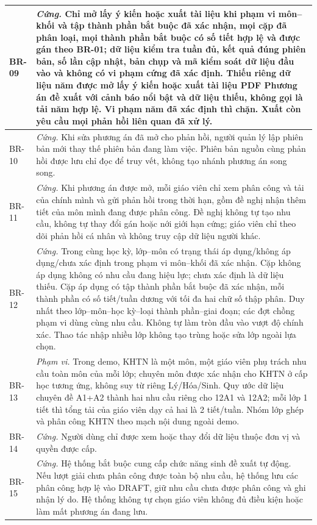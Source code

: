 \documentclass[12pt,a4paper]{report}
\begin{document}
\begin{longtable}{|p{1.45cm}|p{12.5cm}|}
BR-09 & \textit{Cứng.} Chỉ mở lấy ý kiến hoặc xuất tài liệu khi phạm vi môn--khối và tập thành phần bắt buộc đã xác nhận, mọi cặp đã phân loại, mọi thành phần bắt buộc có số tiết hợp lệ và được gán theo BR-01; dữ liệu kiểm tra tuần đủ, kết quả đúng phiên bản, số lần cập nhật, bản chụp và mã kiểm soát dữ liệu đầu vào và không có vi phạm cứng đã xác định. Thiếu riêng dữ liệu năm được mở lấy ý kiến hoặc xuất tài liệu PDF Phương án đề xuất với cảnh báo nổi bật và dữ liệu thiếu, không gọi là tải năm hợp lệ. Vi phạm năm đã xác định thì chặn. Xuất còn yêu cầu mọi phản hồi liên quan đã xử lý. \\\hline
BR-10 & \textit{Cứng.} Khi sửa phương án đã mở cho phản hồi, người quản lý lập phiên bản mới thay thế phiên bản đang làm việc. Phiên bản nguồn cùng phản hồi được lưu chỉ đọc để truy vết, không tạo nhánh phương án song song. \\\hline
BR-11 & \textit{Cứng.} Khi phương án được mở, mỗi giáo viên chỉ xem phân công và tải của chính mình và gửi phản hồi trong thời hạn, gồm đề nghị nhận thêm tiết của môn mình đang được phân công. Đề nghị không tự tạo nhu cầu, không tự thay đổi gán hoặc nới giới hạn cứng; giáo viên chỉ theo dõi phản hồi cá nhân và không truy cập dữ liệu người khác. \\\hline
BR-12 & \textit{Cứng.} Trong cùng học kỳ, lớp--môn có trạng thái áp dụng/không áp dụng/chưa xác định trong phạm vi môn--khối đã xác nhận. Cặp không áp dụng không có nhu cầu đang hiệu lực; chưa xác định là dữ liệu thiếu. Cặp áp dụng có tập thành phần bắt buộc đã xác nhận, mỗi thành phần có số tiết/tuần dương với tối đa hai chữ số thập phân. Duy nhất theo lớp--môn--học kỳ--loại thành phần--giai đoạn; các đợt chồng phạm vi dùng cùng nhu cầu. Không tự làm tròn đầu vào vượt độ chính xác. Thao tác nhập nhiều lớp không tạo trùng hoặc sửa lớp ngoài lựa chọn. \\\hline
BR-13 & \textit{Phạm vi.} Trong demo, KHTN là một môn, một giáo viên phụ trách nhu cầu toàn môn của mỗi lớp; chuyên môn được xác nhận cho KHTN ở cấp học tương ứng, không suy từ riêng Lý/Hóa/Sinh. Quy ước dữ liệu chuyên đề A1+A2 thành hai nhu cầu riêng cho 12A1 và 12A2; mỗi lớp 1 tiết thì tổng tải của giáo viên dạy cả hai là 2 tiết/tuần. Nhóm lớp ghép và phân công KHTN theo mạch nội dung ngoài demo. \\\hline
BR-14 & \textit{Cứng.} Người dùng chỉ được xem hoặc thay đổi dữ liệu thuộc đơn vị và quyền được cấp. \\\hline
BR-15 & \textit{Cứng.} Hệ thống bắt buộc cung cấp chức năng sinh đề xuất tự động. Nếu lượt giải chưa phân công được toàn bộ nhu cầu, hệ thống lưu các phân công hợp lệ vào DRAFT, giữ nhu cầu chưa được phân công và ghi nhận lý do. Hệ thống không tự chọn giáo viên không đủ điều kiện hoặc làm mất phương án đang lưu. \\\hline

\end{longtable}
\end{document}

